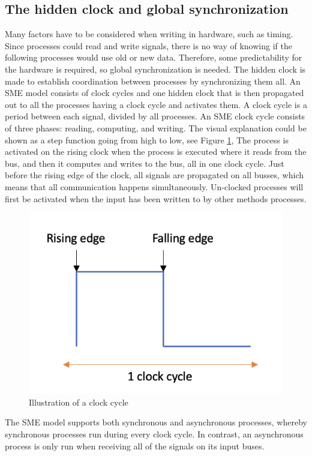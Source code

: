 \subsection{The hidden clock and global synchronization}
Many factors have to be considered when writing in hardware, such as timing. Since processes could read and write signals, there is no way of knowing if the following processes would use old or new data. Therefore, some predictability for the hardware is required, so global synchronization is needed.
The hidden clock is made to establish coordination between processes by synchronizing them all. An SME model consists of clock cycles and one hidden clock that is then propagated out to all the processes having a clock cycle and activates them.
A clock cycle is a period between each signal, divided by all processes.
An SME clock cycle consists of three phases: reading, computing, and writing. The visual explanation could be shown as a step function going from high to low, see Figure \ref{fig:clock}, The process is activated on the rising clock when the process is executed where it reads from the bus, and then it computes and writes to the bus, all in one clock
cycle. Just before the rising edge of the clock, all signals are propagated on all busses, which means that all communication happens simultaneously.
Un-clocked processes will first be activated when the input has been written to by other methods processes.

\begin{figure}
  \centering
  \includegraphics[width=0.5\linewidth]{Pictures/clockcycle.png}
  \caption{Illustration of a clock cycle}
  \label{fig:clock}
\end{figure}

The SME model supports both synchronous and asynchronous processes, whereby synchronous processes run during every clock cycle. In contrast, an asynchronous process is only run when receiving all of the signals on its input buses. 



